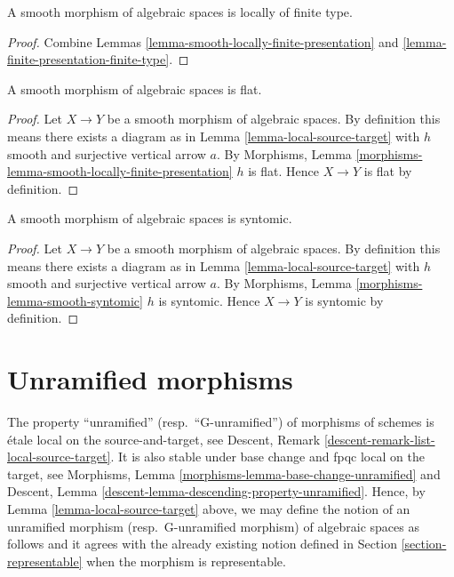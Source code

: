 \begin{lemma}
\label{lemma-smooth-locally-finite-type}
A smooth morphism of algebraic spaces is locally of finite type.
\end{lemma}

\begin{proof}
Combine
Lemmas \ref{lemma-smooth-locally-finite-presentation} and
\ref{lemma-finite-presentation-finite-type}.
\end{proof}

\begin{lemma}
\label{lemma-smooth-flat}
A smooth morphism of algebraic spaces is flat.
\end{lemma}

\begin{proof}
Let $X \to Y$ be a smooth morphism of algebraic spaces. By
definition this means there exists a diagram as in
Lemma \ref{lemma-local-source-target}
with $h$ smooth and surjective vertical arrow $a$. By
Morphisms, Lemma \ref{morphisms-lemma-smooth-locally-finite-presentation}
$h$ is flat. Hence $X \to Y$ is flat by definition.
\end{proof}

\begin{lemma}
\label{lemma-smooth-syntomic}
A smooth morphism of algebraic spaces is syntomic.
\end{lemma}

\begin{proof}
Let $X \to Y$ be a smooth morphism of algebraic spaces. By
definition this means there exists a diagram as in
Lemma \ref{lemma-local-source-target}
with $h$ smooth and surjective vertical arrow $a$. By
Morphisms, Lemma \ref{morphisms-lemma-smooth-syntomic}
$h$ is syntomic. Hence $X \to Y$ is syntomic by definition.
\end{proof}



\section{Unramified morphisms}
\label{section-unramified}

\noindent
The property ``unramified'' (resp.\ ``G-unramified'')
of morphisms of schemes is \'etale local on the source-and-target, see
Descent, Remark \ref{descent-remark-list-local-source-target}.
It is also stable under base change and fpqc local on the target, see
Morphisms, Lemma \ref{morphisms-lemma-base-change-unramified} and
Descent, Lemma \ref{descent-lemma-descending-property-unramified}.
Hence, by
Lemma \ref{lemma-local-source-target}
above, we may define the notion of an unramified morphism
(resp.\ G-unramified morphism) of algebraic spaces
as follows and it agrees with the already existing notion defined in
Section \ref{section-representable}
when the morphism is representable.

